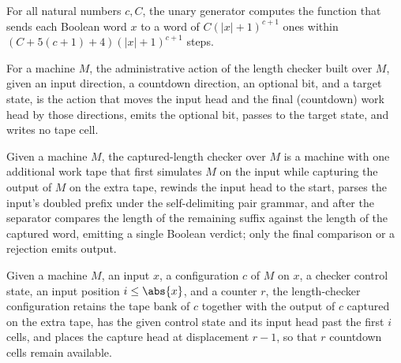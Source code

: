 \begin{lemma}
\label{Turing.FinTM.catalogPoly_unary_computes}
\leanok
{}
For all natural numbers $c,C$, the unary generator computes the function that sends each
Boolean word $x$ to a word of $C(|x|+1)^{c+1}$ ones within $(C+5(c+1)+4)(|x|+1)^{c+1}$
steps.
\end{lemma}

\begin{definition}
\label{Turing.FinTM.lenAction}
\leanok
{}
For a machine $M$, the administrative action of the length checker built
over $M$, given an input direction, a countdown direction, an optional bit,
and a target state, is the action that moves the input head and the final
(countdown) work head by those directions, emits the optional bit, passes to
the target state, and writes no tape cell.
\end{definition}

\begin{definition}
\label{Turing.FinTM.pairCountTM}
\leanok
{}
Given a machine $M$, the captured-length checker over $M$ is a machine with
one additional work tape that first simulates $M$ on the input while
capturing the output of $M$ on the extra tape, rewinds the input head to the
start, parses the input's doubled prefix under the self-delimiting pair
grammar, and after the separator compares the length of the remaining suffix
against the length of the captured word, emitting a single Boolean verdict;
only the final comparison or a rejection emits output.
\end{definition}

\begin{definition}
\label{Turing.FinTM.lenCfg}
\leanok
{}
Given a machine $M$, an input $x$, a configuration $c$ of $M$ on $x$, a
checker control state, an input position $i \le \abs{x}$, and a counter
$r$, the length-checker configuration retains the tape bank of $c$ together
with the output of $c$ captured on the extra tape, has the given control
state and its input head past the first $i$ cells, and places the capture
head at displacement $r - 1$, so that $r$ countdown cells remain available.
\end{definition}


